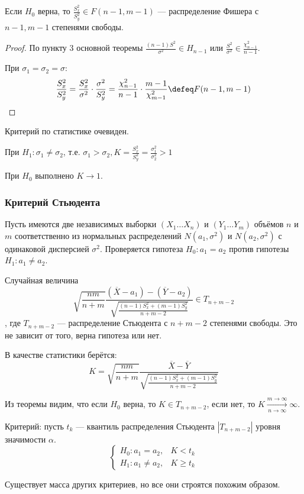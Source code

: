 \begin{theorem}
    Если \(H_0\) верна, то \(\frac{S_x^2}{S_y^2} \in F(n - 1, m - 1)\) --- распределение Фишера с \(n - 1, m - 1\) степенями свободы.
\end{theorem}
\begin{proof}
    По пункту 3 основной теоремы \(\frac{(n - 1)S^2}{\sigma^2} \in H_{n-1}\) или \(\frac{S^2}{\sigma^2} \in \frac{\chi_{n - 1}^2}{n - 1}\).

    При \(\sigma_1 = \sigma_2 = \sigma\):
    \[\frac{S_x^2}{S_y^2} = \frac{S_x^2}{\sigma^2} \cdot \frac{\sigma^2}{S_y^2} = \frac{\chi_{n-1}^2}{n - 1} \cdot \frac{m - 1}{\chi_{m - 1}^2} \defeq F(n - 1, m - 1)\]
\end{proof}

Критерий по статистике очевиден.

\begin{remark}
    При \(H_1 : \sigma_1 \neq \sigma_2\), т.е. \(\sigma_1 > \sigma_2, K = \frac{S_x^2}{S_y^2} = \frac{\sigma_1^2}{\sigma_2^2} > 1\)

    При \(H_0\) выполнено \(K \to 1\).
\end{remark}

\subsubsection{Критерий Стьюдента}

Пусть имеются две независимых выборки \((X_1 \dots X_n)\) и \((Y_1 \dots Y_m)\) объёмов \(n\) и \(m\) соответственно из нормальных распределений \(N(a_1, \sigma^2)\) и \(N(a_2, \sigma^2)\) с одинаковой дисперсией \(\sigma^2\). Проверяется гипотеза \(H_0 : a_1 = a_2\) против гипотезы \(H_1 : a_1 \neq a_2\).

\begin{theorem}
    Случайная величина
    \[\sqrt{\frac{nm}{n + m}} \frac{(\overline{X} - a_1) - (\overline{Y} - a_2)}{\sqrt{\frac{(n - 1)S_x^2 + (m - 1)S_y^2}{n + m - 2}}} \in T_{n + m - 2}\]
    , где \(T_{n + m - 2}\) --- распределение Стьюдента с \(n + m - 2\) степенями свободы. Это не зависит от того, верна гипотеза или нет.
\end{theorem}

В качестве статистики берётся:
\[K = \sqrt{\frac{nm}{n + m}} \frac{\overline{X} - \overline{Y}}{\sqrt{\frac{(n - 1)S_x^2 + (m - 1)S_y^2}{n + m - 2}}}\]

Из теоремы видим, что если \(H_0\) верна, то \(K \in T_{n + m - 2}\), если нет, то \(K \xrightarrow[n \to \infty]{m \to \infty} \infty\).

Критерий: пусть \(t_k\) --- квантиль распределения Стьюдента \(|T_{n + m - 2}|\) уровня значимости \(\alpha\).
\[\begin{cases}
        H_0 : a_1 = a_2,    & K < t_k    \\
        H_1 : a_1 \neq a_2, & K \geq t_k
    \end{cases}\]

Существует масса других критериев, но все они строятся похожим образом.
